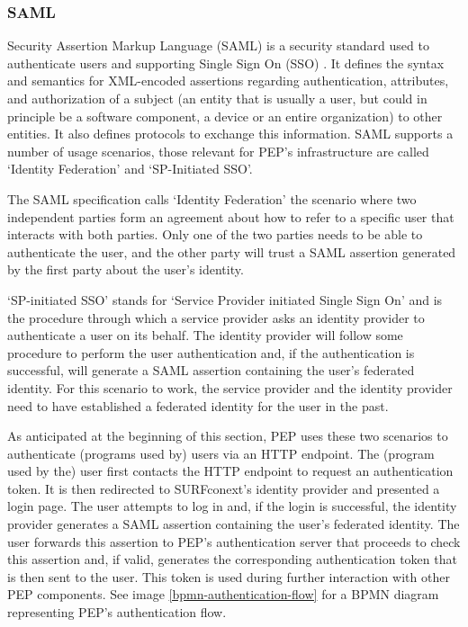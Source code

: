 \documentclass{report}
\begin{document}
\subsubsection{SAML}\label{saml}
Security Assertion Markup Language (SAML) is a security standard used to authenticate users and supporting Single Sign On (SSO) \cite{sstc-saml-core-errata-2.0-wd-07}. It defines
the syntax and semantics for XML-encoded assertions regarding authentication, attributes, and authorization of a subject (an entity that is usually a user, but could in principle
be a software component, a device or an entire organization) to other entities. It also defines protocols to exchange this information. SAML supports a number of usage scenarios, those 
relevant for PEP's infrastructure are called \enquote*{Identity Federation} and \enquote*{SP-Initiated SSO}. \par
The SAML specification calls \enquote*{Identity Federation} the scenario where two independent parties form an agreement about how to refer to a specific user that interacts with both
parties. Only one of the two parties needs to be able to authenticate the user, and the other party will trust a SAML assertion generated by the first party about the user's identity. \par
\enquote*{SP-initiated SSO} stands for \enquote*{Service Provider initiated Single Sign On} and is the procedure through which a service provider asks an identity provider to authenticate a user on
its behalf. The identity provider will follow some procedure to perform the user authentication and, if the authentication is successful, will generate a SAML assertion containing
the user's federated identity. For this scenario to work, the service provider and the identity provider need to have established a federated identity for the user in the past.\par
As anticipated at the beginning of this section, PEP uses these two scenarios to authenticate (programs used by) users via an HTTP endpoint. The (program used by the) user first contacts 
the HTTP endpoint to request an authentication token. It is then redirected to SURFconext's identity provider and presented a login page. The user attempts to log in and, if the login is 
successful, the identity provider generates a SAML assertion containing the user's federated identity. The user forwards this assertion to PEP's authentication server that proceeds to 
check this assertion and, if valid, generates the corresponding authentication token that is then sent to the user. This token is used during further interaction with other PEP 
components. See image \ref{bpmn-authentication-flow} for a BPMN diagram representing PEP's authentication flow.
\end{document}
